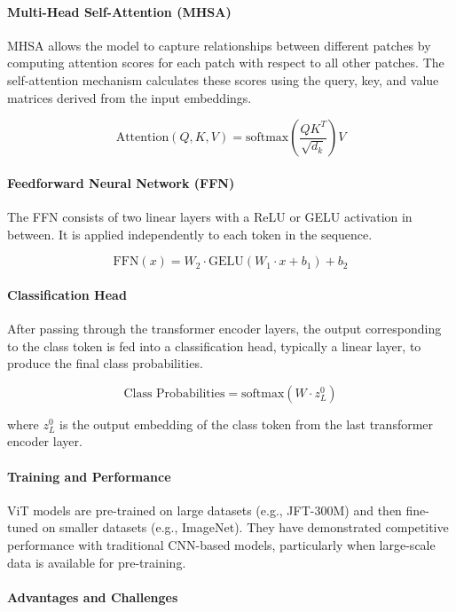 \documentclass[12pt]{article}
\begin{document}
\paragraph{Multi-Head Self-Attention (MHSA)}

MHSA allows the model to capture relationships between different patches by computing attention scores for each patch with respect to all other patches. The self-attention mechanism calculates these scores using the query, key, and value matrices derived from the input embeddings.

\[
\text{Attention}(Q, K, V) = \text{softmax} \left( \frac{QK^T}{\sqrt{d_k}} \right) V
\]

\paragraph{Feedforward Neural Network (FFN)}

The FFN consists of two linear layers with a ReLU or GELU activation in between. It is applied independently to each token in the sequence.

\[
\text{FFN}(x) = W_2 \cdot \text{GELU}(W_1 \cdot x + b_1) + b_2
\]

\paragraph{Classification Head}

After passing through the transformer encoder layers, the output corresponding to the class token is fed into a classification head, typically a linear layer, to produce the final class probabilities.

\[
\text{Class Probabilities} = \text{softmax}(W \cdot z_L^0)
\]

where \(z_L^0\) is the output embedding of the class token from the last transformer encoder layer.

\paragraph{Training and Performance}

ViT models are pre-trained on large datasets (e.g., JFT-300M) and then fine-tuned on smaller datasets (e.g., ImageNet). They have demonstrated competitive performance with traditional CNN-based models, particularly when large-scale data is available for pre-training.

\paragraph{Advantages and Challenges}
\end{document}
